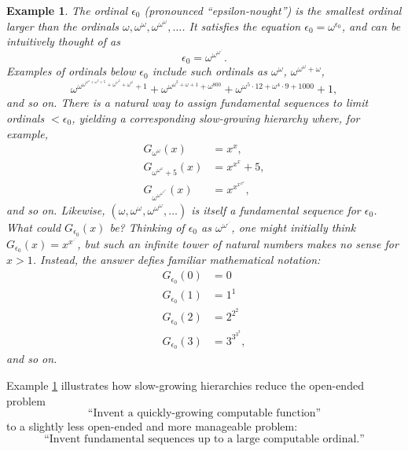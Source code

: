 \documentclass{article}
\newtheorem{example}[theorem]{Example}
\begin{document}
\begin{example}
\label{epsilon0example}
    The ordinal $\epsilon_0$
    (pronounced ``epsilon-nought'') is the smallest ordinal larger than
    the ordinals $\omega, \omega^\omega, \omega^{\omega^\omega}, \ldots$.
    It satisfies the equation $\epsilon_0=\omega^{\epsilon_0}$, and can be
    intuitively thought of as
    \[
        \epsilon_0 = \omega^{\omega^{\omega^{\iddots}}}.
    \]
    Examples of ordinals below $\epsilon_0$ include such ordinals as
    $\omega^\omega$, $\omega^{\omega^\omega+\omega}$,
    \[
        \omega^{\omega^{\omega^{\omega^\omega+\omega^3+5}+\omega^{\omega^2}+\omega^\omega}+1}
        +\omega^{\omega^{\omega^2+\omega+1}+\omega^{800}}
        +\omega^{\omega^5\cdot 12 + \omega^4\cdot 9 + 1000}
        +1,
    \]
    and so on. There is a natural way to assign fundamental sequences to limit ordinals
    $<\epsilon_0$, yielding a corresponding slow-growing hierarchy where, for example,
    \begin{align*}
        G_{\omega^\omega}(x) &= x^x,\\
        G_{\omega^{\omega^\omega}+5}(x) &= x^{x^x}+5,\\
        G_{\omega^{\omega^{\omega^{\omega^\omega}}}}(x) &= x^{x^{x^{x^{x}}}},
    \end{align*}
    and so on. Likewise, $(\omega,\omega^\omega,\omega^{\omega^\omega},\ldots)$ is itself a
    fundamental sequence for $\epsilon_0$. What could $G_{\epsilon_0}(x)$ be?
    Thinking of $\epsilon_0$ as $\omega^{\omega^{\iddots}}$, one might initially think
    $G_{\epsilon_0}(x)=x^{x^{\iddots}}$, but such an infinite tower of natural numbers
    makes no sense for $x>1$. Instead, the answer defies familiar mathematical notation:
    \begin{align*}
        G_{\epsilon_0}(0) &= 0\\
        G_{\epsilon_0}(1) &= 1^1\\
        G_{\epsilon_0}(2) &= 2^{2^2}\\
        G_{\epsilon_0}(3) &= 3^{3^{3^3}},
    \end{align*}
    and so on.
\end{example}

Example \ref{epsilon0example} illustrates how slow-growing hierarchies reduce
the open-ended problem
\[\mbox{``Invent a quickly-growing computable function''}\]
to a slightly less open-ended and more manageable problem:
\[\mbox{``Invent fundamental sequences up to a large computable ordinal.''}\]
\end{document}
